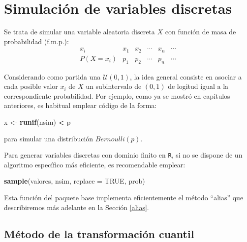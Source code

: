\documentclass[
]{book}
\newenvironment{Shaded}{\begin{snugshade}}{\end{snugshade}}
\newcommand{\DataTypeTok}[1]{\textcolor[rgb]{0.13,0.29,0.53}{#1}}
\newcommand{\KeywordTok}[1]{\textcolor[rgb]{0.13,0.29,0.53}{\textbf{#1}}}
\newcommand{\NormalTok}[1]{#1}
\newcommand{\OperatorTok}[1]{\textcolor[rgb]{0.81,0.36,0.00}{\textbf{#1}}}
\newcommand{\OtherTok}[1]{\textcolor[rgb]{0.56,0.35,0.01}{#1}}
\newcommand{\StringTok}[1]{\textcolor[rgb]{0.31,0.60,0.02}{#1}}
\theoremstyle{break}
\theoremstyle{definition}
\theoremstyle{definition}
\theoremstyle{definition}
\theoremstyle{remark}
\begin{document}
\hypertarget{cap6}{%
\chapter{Simulación de variables discretas}\label{cap6}}

Se trata de simular una variable aleatoria discreta \(X\) con función de masa de
probabilidad (f.m.p.):
\[\begin{array}{l|ccccc}
 x_{i}  &  x_{1}  &  x_{2}  &  \cdots   &  x_{n}  &  \cdots   \\ \hline
 P\left( X=x_{i}\right)   &  p_{1}  &  p_{2}  &  \cdots   &  p_{n}  &  
\cdots  
\end{array}\]

Considerando como partida una \(\mathcal{U}\left( 0,1\right)\), la
idea general consiste en asociar a cada posible valor \(x_{i}\) de \(X\)
un subintervalo de \(\left( 0,1\right)\) de logitud igual a la correspondiente
probabilidad.
Por ejemplo, como ya se mostró en capítulos anteriores, es habitual emplear
código de la forma:

\begin{Shaded}
\begin{Highlighting}[]
\NormalTok{x <-}\StringTok{ }\KeywordTok{runif}\NormalTok{(nsim) }\OperatorTok{<}\StringTok{ }\NormalTok{p}
\end{Highlighting}
\end{Shaded}

para simular una distribución \(Bernoulli(p)\).

Para generar variables discretas con dominio finito en \texttt{R},
si no se dispone de un algoritmo específico más eficiente,
es recomendable emplear:

\begin{Shaded}
\begin{Highlighting}[]
\KeywordTok{sample}\NormalTok{(valores, nsim, }\DataTypeTok{replace =} \OtherTok{TRUE}\NormalTok{, prob)}
\end{Highlighting}
\end{Shaded}

Esta función del paquete base implementa eficientemente el método ``alias''
que describiremos más adelante en la Sección \ref{alias}.

\hypertarget{muxe9todo-de-la-transformaciuxf3n-cuantil}{%
\section{Método de la transformación cuantil}\label{muxe9todo-de-la-transformaciuxf3n-cuantil}}
\end{document}
